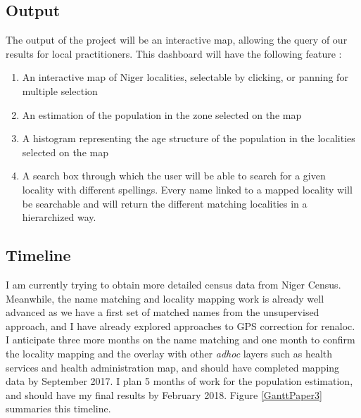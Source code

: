 \subsection{Output}

The output of the project will  be an interactive map, allowing the query of our results for local practitioners. This dashboard will have the following feature :
\begin{enumerate}
	\item An interactive map of Niger localities, selectable by clicking, or panning for multiple selection
	\item An estimation of the population in the zone selected on the map
	\item A histogram representing the age structure of the population in the localities selected on the map
	\item A search box through which the user will be able to search for a given locality with different spellings. Every name linked to a mapped locality will be searchable and will return the different matching localities in a hierarchized way.
\end{enumerate}



\subsection{Timeline}
\label{timeline:aim2}
I am currently trying to obtain more detailed census data from Niger Census. Meanwhile, the name matching and locality mapping work is already well advanced as we have a first set of matched names from the unsupervised approach, and I have already explored approaches to GPS correction for \gls{renaloc}. I anticipate three more months on the name matching and one month to confirm the locality mapping and the overlay with other \textit{adhoc} layers such as health services and health administration map, and should have completed mapping data by September 2017. I plan 5 months of work for the population estimation, and should have my final results by February 2018. Figure \ref{GanttPaper3} summaries this timeline.

